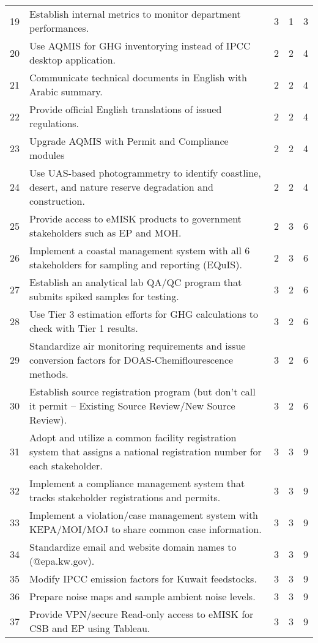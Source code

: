 \begin{table}[H]
{\begin{tabular}{@{}clccc@{}}
19 & Establish internal metrics to monitor department performances. & 3 & 1 & 3 \\
20 & Use AQMIS for GHG inventorying instead of IPCC desktop application. & 2 & 2 & 4 \\
21 & Communicate technical documents in English with Arabic summary. & 2 & 2 & 4 \\
22 & Provide official English translations of issued regulations. & 2 & 2 & 4 \\
23 & Upgrade AQMIS with Permit and Compliance modules & 2 & 2 & 4 \\
24 & Use UAS-based photogrammetry to identify coastline, desert, and nature reserve degradation and construction. & 2 & 2 & 4 \\
25 & Provide access to eMISK products to government stakeholders such as EP and MOH. & 2 & 3 & 6 \\
26 & Implement a coastal management system with all 6 stakeholders for sampling and reporting (EQuIS). & 2 & 3 & 6 \\
27 & Establish an analytical lab QA/QC program that submits spiked samples for testing. & 3 & 2 & 6 \\
28 & Use Tier 3 estimation efforts for GHG calculations to check with Tier 1 results. & 3 & 2 & 6 \\
29 & Standardize air monitoring requirements and issue conversion factors for DOAS-Chemiflourescence methods. & 3 & 2 & 6 \\
30 & Establish source registration program (but don’t call it permit – Existing Source Review/New Source Review). & 3 & 2 & 6 \\
31 & Adopt and utilize a common facility registration system that assigns a national registration number for each stakeholder. & 3 & 3 & 9 \\
32 & Implement a compliance management system that tracks stakeholder registrations and permits. & 3 & 3 & 9 \\
33 & Implement a violation/case management system with KEPA/MOI/MOJ to share common case information. & 3 & 3 & 9 \\
34 & Standardize email and website domain names to (@epa.kw.gov). & 3 & 3 & 9 \\
35 & Modify IPCC emission factors for Kuwait feedstocks. & 3 & 3 & 9 \\
36 & Prepare noise maps and sample ambient noise levels. & 3 & 3 & 9 \\
37 & Provide VPN/secure Read-only access to eMISK for CSB and EP using Tableau. & 3 & 3 & 9 \\ \bottomrule
\end{tabular}
} %
\end{table}

